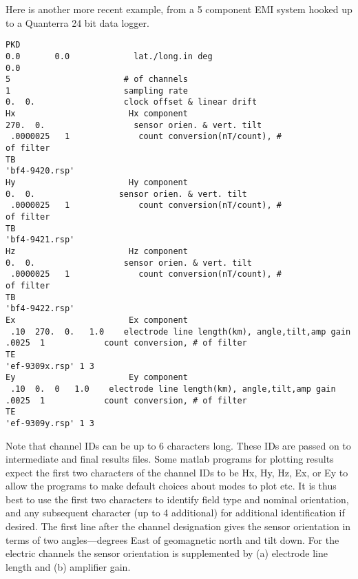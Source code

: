 Here is another more recent example, from a 5 component EMI system
hooked up to a Quanterra 24 bit data logger.
\small

\begin{verbatim}
PKD
0.0       0.0             lat./long.in deg
0.0
5                       # of channels
1                       sampling rate
0.  0.                  clock offset & linear drift
Hx                       Hx component
270.  0.                  sensor orien. & vert. tilt
 .0000025   1              count conversion(nT/count), #
of filter
TB
'bf4-9420.rsp'
Hy                       Hy component
0.  0.                 sensor orien. & vert. tilt
 .0000025   1              count conversion(nT/count), #
of filter
TB
'bf4-9421.rsp'
Hz                       Hz component
0.  0.                  sensor orien. & vert. tilt
 .0000025   1              count conversion(nT/count), #
of filter
TB
'bf4-9422.rsp'
Ex                       Ex component
 .10  270.  0.   1.0    electrode line length(km), angle,tilt,amp gain
.0025  1            count conversion, # of filter
TE
'ef-9309x.rsp' 1 3
Ey                       Ey component
 .10  0.  0   1.0    electrode line length(km), angle,tilt,amp gain
.0025  1            count conversion, # of filter
TE
'ef-9309y.rsp' 1 3
\end{verbatim}
\normalsize

Note that channel IDs can be up to 6 characters long.
These IDs are passed on to intermediate and final results files.
Some matlab programs for plotting results
expect the first two characters of the channel IDs to be 
Hx, Hy, Hz, Ex, or Ey to allow the programs to make
default choices about modes to plot etc.  It is thus best
to use the first two characters to identify field type and nominal
orientation, and any subsequent character (up to 4 additional)
for additional identification if desired.
The first line after the channel designation gives the
sensor orientation in terms of two angles---degrees East
of geomagnetic north and tilt down.
For the electric channels the sensor orientation is supplemented
by (a) electrode line length and (b) amplifier gain.

